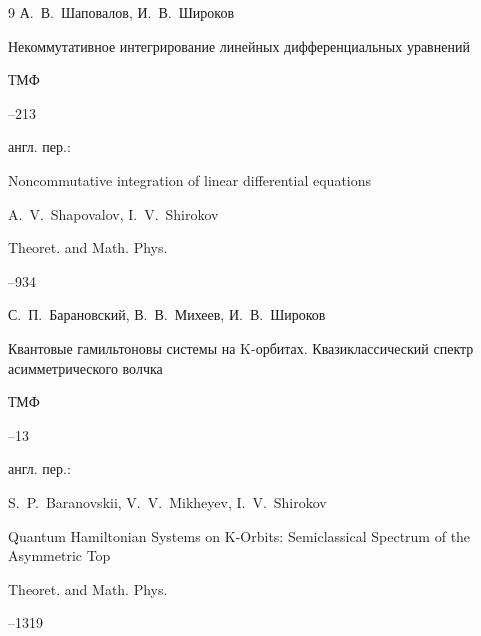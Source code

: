 \begin{thebibliography}{9}
\by А.~В.~Шаповалов, И.~В.~Широков

\paper Некоммутативное интегрирование линейных дифференциальных уравнений

\jour ТМФ




--213




\transl англ. пер.:~

\paper Noncommutative integration of linear differential equations

\by A.~V.~Shapovalov, I.~V.~Shirokov 

\jour Theoret. and Math. Phys.




--934






\by С.~П.~Барановский, В.~В.~Михеев, И.~В.~Широков

\paper Квантовые гамильтоновы системы на K-орбитах. Квазиклассический спектр асимметрического волчка

\jour ТМФ




--13





\transl англ. пер.:~

\by S.~P.~Baranovskii, V.~V.~Mikheyev, I.~V.~Shirokov

\paper Quantum Hamiltonian Systems on K-Orbits: Semiclassical Spectrum of the Asymmetric Top

\jour Theoret. and Math. Phys.




--1319




\end{thebibliography}
